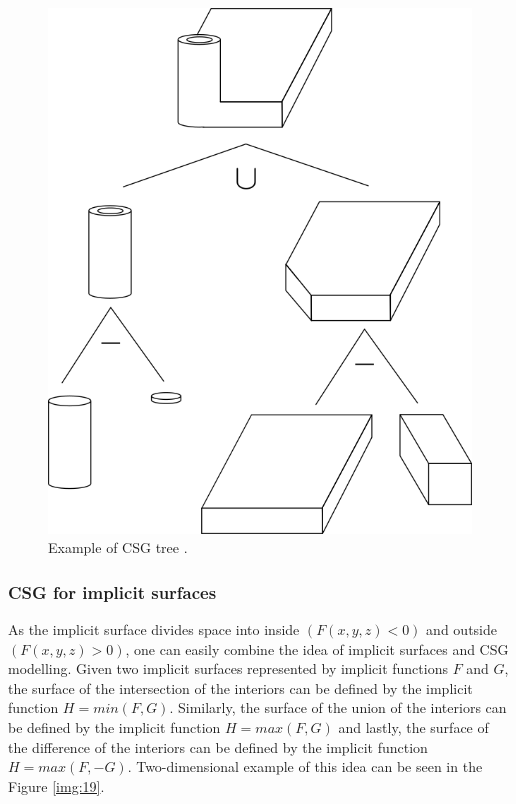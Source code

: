 \begin{figure}
    \centerline{\includegraphics[scale=0.5]{images/img18}}
    \caption[Example of CSG tree]
    {Example of CSG tree \cite{foley1996computer}.}
    \label{img:18}
\end{figure}

\subsubsection*{CSG for implicit surfaces}
As the implicit surface divides space into inside $(F(x, y, z) < 0)$ and
outside $(F(x, y, z) > 0)$, one can easily combine the idea of
implicit surfaces and CSG modelling. Given two implicit surfaces represented
by implicit functions $F$ and $G$, the surface of the
intersection of the interiors can be defined by the implicit function $H=min(F, G)$.
Similarly, the surface of the union of the interiors can be defined
by the implicit function $H=max(F, G)$ and lastly, the surface of the difference of
the interiors can be defined by the implicit function $H=max(F, -G)$. Two-dimensional
example of this idea can be seen in the Figure \ref{img:19}.

